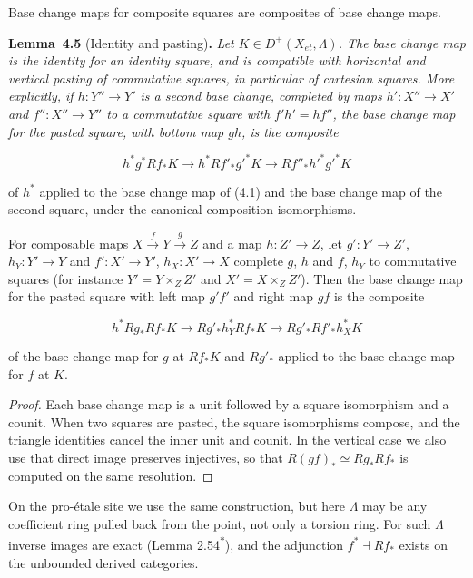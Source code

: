 \documentclass[11pt]{article}
\newenvironment{bpstatement}[2]{\par\addvspace{0.6\baselineskip}\noindent\textbf{#1}#2\textbf{.}\enspace\ignorespaces}
  {\par\addvspace{0.4\baselineskip}}
\newenvironment{bpstatementit}[2]{\begin{bpstatement}{#1}{#2}\itshape\ignorespaces}{\end{bpstatement}}
\newcommand{\bpout}[1]{#1\textsuperscript{\hyperlink{bp-outside}{\ensuremath{\ast}}}}
\begin{document}
Base change maps for composite squares are composites of base change maps.

\label{bp15}%
\begin{bpstatementit}{Lemma~4.5}{ (Identity and pasting)}
Let \(K\in D^+(X_{\acute{e}t},\Lambda)\). The base change map is the identity for an identity square, and is compatible with horizontal and vertical pasting of commutative squares, in particular of cartesian squares. More explicitly, if \(h:Y''\to Y'\) is a second base change, completed by maps \(h':X''\to X'\) and \(f'':X''\to Y''\) to a commutative square with \(f'h'=hf''\), the base change map for the pasted square, with bottom map \(gh\), is the composite

\[
h^*g^*Rf_*K
\longrightarrow
h^*Rf'_*g'^*K
\longrightarrow
Rf''_*h'^*g'^*K
\]

of \(h^*\) applied to the base change map of (4.1) and the base change map of the second square, under the canonical composition isomorphisms.

For composable maps \(X\xrightarrow{f}Y\xrightarrow{g}Z\) and a map \(h:Z'\to Z\), let \(g':Y'\to Z'\), \(h_Y:Y'\to Y\) and \(f':X'\to Y'\), \(h_X:X'\to X\) complete \(g\), \(h\) and \(f\), \(h_Y\) to commutative squares (for instance \(Y'=Y\times_ZZ'\) and \(X'=X\times_ZZ'\)). Then the base change map for the pasted square with left map \(g'f'\) and right map \(gf\) is the composite

\[
h^*Rg_*Rf_*K
\longrightarrow
Rg'_*h_Y^*Rf_*K
\longrightarrow
Rg'_*Rf'_*h_X^*K
\]

of the base change map for \(g\) at \(Rf_*K\) and \(Rg'_*\) applied to the base change map for \(f\) at \(K\).
\end{bpstatementit}

\begin{proof}[{Proof}]\label{bp16}%
Each base change map is a unit followed by a square isomorphism and a counit. When two squares are pasted, the square isomorphisms compose, and the triangle identities cancel the inner unit and counit. In the vertical case we also use that direct image preserves injectives, so that \(R(gf)_*\simeq Rg_*Rf_*\) is computed on the same resolution.
\end{proof}

\label{bp17}%
On the pro-étale site we use the same construction, but here \(\Lambda\) may be any coefficient ring pulled back from the point, not only a torsion ring. For such \(\Lambda\) inverse images are exact (Lemma \bpout{2.54}), and the adjunction \(f^*\dashv Rf_*\) exists on the unbounded derived categories.
\end{document}
